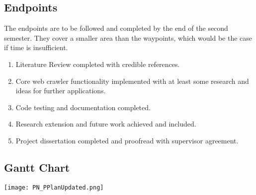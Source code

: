 \documentclass[a4paper, 12pt, titlepage]{article}
\begin{document}
\subsection{Endpoints}
The endpoints are to be followed and completed by the end of the second semester. They cover a smaller area than the waypoints, which would be the case if time is insufficient.
\begin{enumerate}
\item{Literature Review completed with credible references.}
\item{Core web crawler functionality implemented with at least some research and ideas for further applications.}
\item{Code testing and documentation completed.}
\item{Research extension and future work achieved and included.}
\item{Project dissertation completed and proofread with supervisor agreement.}
\end{enumerate}

\subsection{Gantt Chart}
\begin{center}
\texttt{[image: PN\_PPlanUpdated.png]}
\label{fig:PP}
\end{center}
\end{document}
